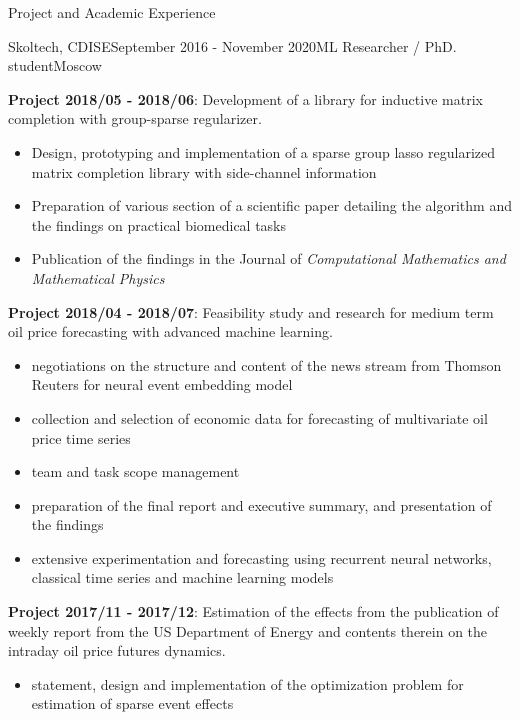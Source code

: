 \documentclass{resume} %
\begin{document}
\begin{rSection}{Project and Academic Experience}
\begin{rSubsection}{Skoltech, CDISE}{September 2016 - November 2020}{ML Researcher / PhD. student}{Moscow}
    \medskip
    \item \textbf{Project 2018/05 - 2018/06}:
    Development of a library for inductive matrix completion with group-sparse regularizer.
    \begin{itemize}
        \item Design, prototyping and implementation of a sparse group lasso regularized
        matrix completion library with side-channel information
        
        \item Preparation of various section of a scientific paper detailing the algorithm
        and the findings on practical biomedical tasks
        
        \item Publication of the findings in the Journal of \emph{Computational Mathematics
        and Mathematical Physics}
    \end{itemize}

    \medskip
    \item \textbf{Project 2018/04 - 2018/07}:
    Feasibility study and research for medium term oil price forecasting with advanced machine
    learning. \begin{itemize}
        \item negotiations on the structure and content of the news stream from Thomson Reuters
        for neural event embedding model
        
        \item collection and selection of economic data for forecasting of multivariate oil
        price time series
        
        \item team and task scope management
        
        \item preparation of the final report and executive summary, and presentation
        of the findings
        
        \item extensive experimentation and forecasting using recurrent neural networks, classical
        time series and machine learning models
    \end{itemize}

    \medskip
    \item \textbf{Project 2017/11 - 2017/12}:
    Estimation of the effects from the publication of weekly report from the US Department
    of Energy and contents therein on the intraday oil price futures dynamics.
    \begin{itemize}
        \item statement, design and implementation of the optimization problem for
        estimation of sparse event effects
        

\end{itemize}
\end{rSubsection}
\end{rSection}
\end{document}
